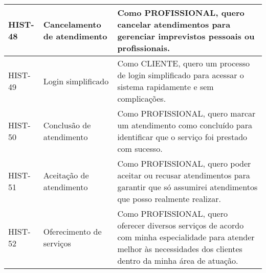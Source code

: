 \begin{longtable}{|p{2cm}|p{4cm}|p{9cm}|}
	HIST-48 & Cancelamento de atendimento & Como PROFISSIONAL, quero cancelar atendimentos para gerenciar imprevistos pessoais ou profissionais. \\ \hline
	HIST-49 & Login simplificado & Como CLIENTE, quero um processo de login simplificado para acessar o sistema rapidamente e sem complicações. \\ \hline
	HIST-50 & Conclusão de atendimento & Como PROFISSIONAL, quero marcar um atendimento como concluído para identificar que o serviço foi prestado com sucesso. \\ \hline
	HIST-51 & Aceitação de atendimento & Como PROFISSIONAL, quero poder aceitar ou recusar atendimentos para garantir que só assumirei atendimentos que posso realmente realizar. \\ \hline
	HIST-52 & Oferecimento de serviços & Como PROFISSIONAL, quero oferecer diversos serviços de acordo com minha especialidade para atender melhor às necessidades dos clientes dentro da minha área de atuação. \\ \hline
\end{longtable}